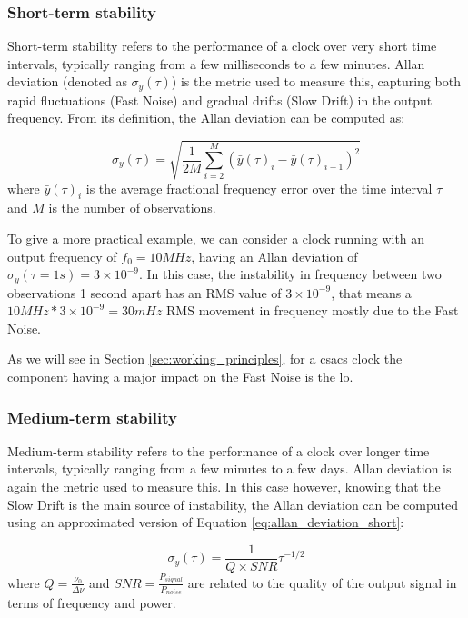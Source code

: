 \subsubsection{Short-term stability}

Short-term stability refers to the performance of a clock over very short time intervals, typically ranging from a few milliseconds to a few minutes.
Allan deviation (denoted as $\sigma_y(\tau)$) is the metric used to measure this, capturing both rapid fluctuations (Fast Noise) and gradual drifts (Slow Drift) in the output frequency.
From its definition, the Allan deviation can be computed as:

\begin{equation}
  \sigma_y(\tau) = \sqrt{\frac{1}{2M} \sum_{i=2}^{M} (\bar{y}(\tau)_{i} - \bar{y}(\tau)_{i-1})^2}
  \label{eq:allan_deviation_short}
\end{equation}
%
where $\bar{y}(\tau)_{i}$ is the average fractional frequency error over the time interval $\tau$ and $M$ is the number of observations.

To give a more practical example, we can consider a clock running with an output frequency of $f_0 = 10MHz$, having an Allan deviation of $\sigma_y(\tau=1s) = 3 \times 10^{-9}$.
In this case, the instability in frequency between two observations 1 second apart has an RMS value of $3 \times 10^{-9}$, that means a $10MHz * 3 \times 10^{-9} = 30mHz$ RMS movement in frequency mostly due to the Fast Noise.

As we will see in Section \ref{sec:working_principles}, for a \acrshort{csacs} clock the component having a major impact on the Fast Noise is the \acrfull{lo}.


\subsubsection{Medium-term stability}

Medium-term stability refers to the performance of a clock over longer time intervals, typically ranging from a few minutes to a few days.
Allan deviation is again the metric used to measure this.
In this case however, knowing that the Slow Drift is the main source of instability, the Allan deviation can be computed using an approximated version of Equation \ref{eq:allan_deviation_short}:

\begin{equation}
  \sigma_y(\tau) = \frac{1}{Q \times SNR} \tau^{-1/2}
  \label{eq:allan_deviation_medium}
\end{equation}
%
where $Q = \frac{\nu_0}{\Delta \nu}$ and $SNR = \frac{P_{signal}}{P_{noise}}$ are related to the quality of the output signal in terms of frequency and power.

